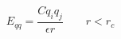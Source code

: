 \documentclass[12pt]{article}
\begin{document}
$$
  E_{qq} = \frac{C q_i q_j}{\epsilon  r} \qquad r < r_c
$$
\end{document}
